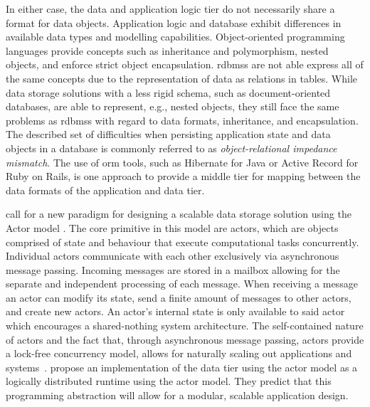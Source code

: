   In either case, the data and application logic tier do not necessarily share a format for data objects.
  Application logic and database exhibit differences in available data types and modelling capabilities.
  Object-oriented programming languages provide concepts such as inheritance and polymorphism, nested objects, and enforce strict object encapsulation.
  \glspl{rdbms} are not able express all of the same concepts due to the representation of data as relations in tables. %
  While data storage solutions with a less rigid schema, such as document-oriented databases, are able to represent, e.g., nested objects, they still face the same problems as \glspl{rdbms} with regard to data formats, inheritance, and encapsulation.
  The described set of difficulties when persisting application state and data objects in a database is commonly referred to as \textit{object-relational impedance mismatch}.
  The use of \gls{orm} tools, such as Hibernate for Java or Active Record for Ruby on Rails, is one approach to provide a middle tier for mapping between the data formats of the application and data tier.

  \citeauthor{manifesto} call for a new paradigm for designing a scalable data storage solution using the Actor model \cite{manifesto}.
  The core primitive in this model are actors, which are objects comprised of state and behaviour that execute computational tasks concurrently.
  Individual actors communicate with each other exclusively via asynchronous message passing.
  Incoming messages are stored in a mailbox allowing for the separate and independent processing of each message.
  When receiving a message an actor can modify its state, send a finite amount of messages to other actors, and create new actors.
  An actor's internal state is only available to said actor which encourages a shared-nothing system architecture.
  The self-contained nature of actors and the fact that, through asynchronous message passing, actors provide a lock-free concurrency model, allows for naturally scaling out applications and systems~\cite{vernon2015reactive}.
  \citeauthor{manifesto} propose an implementation of the data tier using the actor model as a logically distributed runtime using the actor model.
  They predict that this programming abstraction will allow for a modular, scalable application design.

